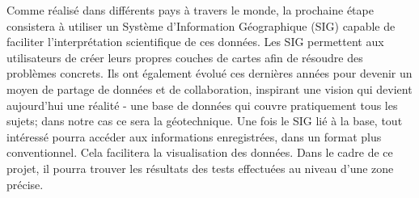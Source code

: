 \par
Comme réalisé dans différents pays à travers le monde, la prochaine 
étape consistera à utiliser un Système d'Information Géographique (SIG) 
capable de faciliter l'interprétation scientifique de ces données. 
Les SIG permettent aux utilisateurs de créer leurs propres couches de cartes 
afin de résoudre des problèmes concrets. Ils ont également évolué ces dernières années pour 
devenir un moyen de partage de données et de collaboration, inspirant une 
vision qui devient aujourd’hui une réalité - une base de données qui 
couvre pratiquement tous les sujets; dans notre cas ce sera la géotechnique. 
Une fois le SIG lié à la base, tout intéressé pourra accéder aux informations 
enregistrées, dans un format plus conventionnel. Cela facilitera la visualisation des données. 
Dans le cadre de ce projet, il 
pourra trouver les résultats des tests effectuées au niveau d'une zone précise.